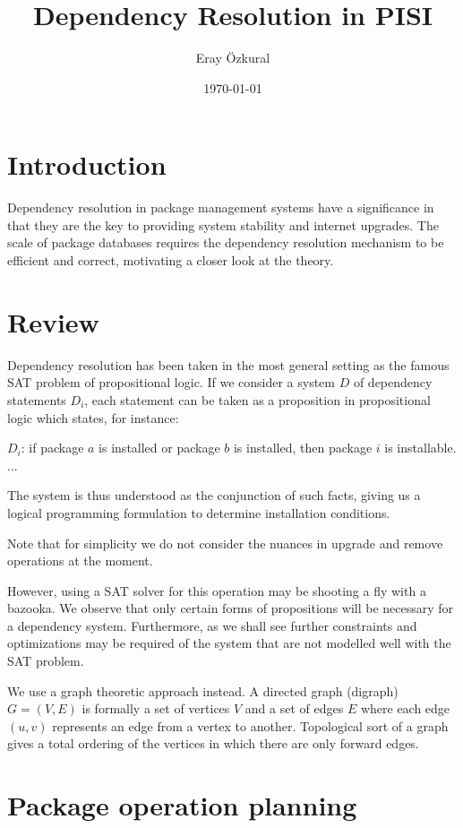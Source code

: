 \documentclass[a4paper,11pt]{article}
\title{ Dependency Resolution in PISI}
\author{Eray \"{O}zkural}
\date{\today}
\begin{document}
\maketitle



\section{Introduction}

Dependency resolution in package management systems have a
significance in that they are the key to providing system stability
and internet upgrades. The scale of package databases requires the
dependency resolution mechanism to be efficient and correct,
motivating a closer look at the theory.


\section{Review}

Dependency resolution has been taken in the most general setting as
the famous SAT problem of propositional logic. If we consider a system
$D$ of dependency statements $D_i$, each statement can be taken as a
proposition in propositional logic which states, for instance:

$D_i$: if package $a$ is installed or package $b$ is installed, then
package $i$ is installable.\\
...

The system is thus understood as the conjunction of such facts, giving
us a logical programming formulation to determine installation conditions.

Note that for simplicity we do not consider the nuances in upgrade and
remove operations at the moment.

However, using a SAT solver for this operation may be shooting a fly
with a bazooka. We observe that only certain forms of propositions
will be necessary for a dependency system. Furthermore, as we shall
see further constraints and optimizations may be required of the
system that are not modelled well with the SAT problem.

We use a graph theoretic approach instead. A directed graph (digraph)
$G=(V,E)$ is formally a set of vertices $V$ and a set of edges $E$
where each edge $(u,v)$ represents an edge from a vertex to
another. Topological sort of a graph gives a total ordering of the
vertices in which there are only forward edges. 

\section{Package operation planning}
\end{document}
